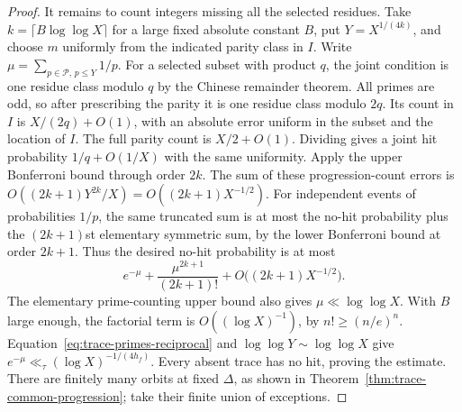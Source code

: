 \documentclass[11pt]{amsart}
\theoremstyle{definition}
\theoremstyle{remark}
\numberwithin{equation}{section}
\begin{document}
\begin{proof}
It remains to count integers missing all the selected residues.
Take $k=\lceil B\log\log X\rceil$ for a large fixed absolute
constant $B$, put $Y=X^{1/(4k)}$, and choose $m$ uniformly
from the indicated parity class in $I$.
Write $\mu=\sum_{p\in\mathcal P,\,p\le Y}1/p$.
For a selected subset with product $q$, the joint condition
is one residue class modulo $q$ by the Chinese remainder
theorem. All primes are odd, so after prescribing the parity
it is one residue class modulo $2q$. Its count in $I$
is $X/(2q)+O(1)$, with an absolute error uniform in the
subset and the location of $I$. The full parity count is
$X/2+O(1)$. Dividing gives a joint hit probability
$1/q+O(1/X)$ with the same uniformity. Apply the upper Bonferroni bound through order $2k$.
The sum of these progression-count errors is
$O((2k+1)Y^{2k}/X)=O((2k+1)X^{-1/2})$.
For independent events of probabilities $1/p$, the same
truncated sum is at most the no-hit probability plus the
$(2k+1)$st elementary symmetric sum, by the lower Bonferroni
bound at order $2k+1$. Thus the desired no-hit probability is at most
\[
 e^{-\mu}+\frac{\mu^{2k+1}}{(2k+1)!}
                  +O\bigl((2k+1)X^{-1/2}\bigr).
\]
The elementary prime-counting upper bound also gives
$\mu\ll\log\log X$. With $B$ large enough, the factorial term
is $O((\log X)^{-1})$, by $n!\ge(n/e)^n$.
Equation~\eqref{eq:trace-primes-reciprocal} and
$\log\log Y\sim\log\log X$ give
$e^{-\mu}\ll_\tau(\log X)^{-1/(4h_f)}$.
Every absent trace has no hit, proving the estimate.
There are finitely many orbits at fixed $\Delta$, as shown
in Theorem~\ref{thm:trace-common-progression}; take their
finite union of exceptions.
\end{proof}
\end{document}
